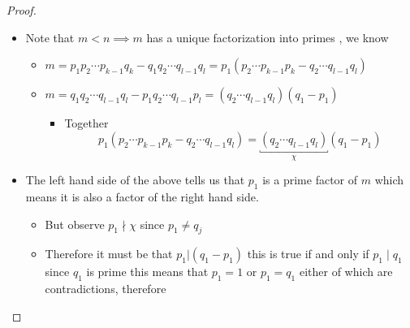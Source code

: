 \documentclass[11pt]{book}
\begin{document}
\begin{proof}
\begin{itemize}
\begin{itemize}
        \end{itemize}
    \item Note that $m < n \implies m$ has a unique factorization into primes , we know
        \begin{itemize}
            \item $m = p_1 p_2 \dotsb p_{k - 1} q_{k}  - q_1 q_2 \dotsb q_{l - 1} q_{l}= p_{1} \left( p_2 \dotsb p_{k - 1} p_{k} - q_2 \dotsb q_{l - 1} q_{l} \right) $ 
            \item $m = q_1 q_2 \dotsb q_{l - 1} q_{l} - p_1 q_2 \dotsb q_{l - 1} p_{l} = \left(  q_2 \dotsb q_{l - 1} q_{l} \right) \left( q_{1}  - p_{1}  \right) $ 
            \begin{itemize}
                \item Together
                    \[
 p_{1} \left( p_2 \dotsb p_{k - 1} p_{k} - q_2 \dotsb q_{l - 1} q_{l} \right) = \underbracket{\left(  q_2 \dotsb q_{l - 1} q_{l} \right)}_{\chi}  \left( q_{1}  - p_{1}  \right) 
                    \]
            \end{itemize}
        \end{itemize}
    \item The left hand side of the above tells us that $p_{1} $ is a prime factor of $m$ which means it is also a factor of the right hand side.
        \begin{itemize}
            \item But observe $p_{1} \nmid \chi$ since $p_{1} \neq q_{j} $ 
            \item Therefore it must be that $p_{1} | \left( q_{1}  - p_{1}  \right) $ this is true if and only if $p_{1} \mid q_{1} $ since $q_{1} $ is prime this means that $p_{1} = 1$ or $p_{1} = q_{1} $ either of which are contradictions, therefore  
        \end{itemize}
\end{itemize}
\end{proof}

\end{document}
